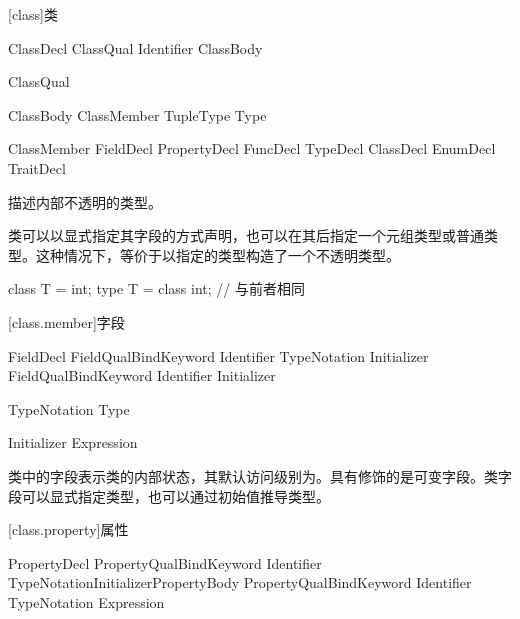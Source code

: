 
[class]{类}

\begin{bnf}{ClassDecl}
    ClassQual\bnfs {} Identifier ClassBody
\end{bnf}

\begin{bnf}{ClassQual}
\end{bnf}

\begin{bnf}{ClassBody}
    \terminal{\{} ClassMember\bnfs \terminal{\}} \br
    TupleType \br
    \terminal{=} Type
\end{bnf}

\begin{bnf}{ClassMember}
    FieldDecl \br
    PropertyDecl \br
    FuncDecl \br
    TypeDecl \br
    ClassDecl \br
    EnumDecl \br
    TraitDecl
\end{bnf}

\pnum
{}描述内部不透明的类型。

\pnum
类可以以显式指定其字段的方式声明，也可以在其后指定一个元组类型或普通类型。这种情况下，等价于以指定的类型构造了一个不透明类型。

\enterexample
\begin{codeblock}
class T = int;
type T = class int; // 与前者相同
\end{codeblock}
\exitexample

[class.member]{字段}

\begin{bnf}{FieldDecl}
    FieldQual\bnfs BindKeyword Identifier TypeNotation Initializer\bnfq \terminal{;}
    FieldQual\bnfs BindKeyword Identifier Initializer \terminal{;}
\end{bnf}

\begin{bnf}{TypeNotation}
    \terminal{:} Type
\end{bnf}

\begin{bnf}{Initializer}
    \terminal{=} Expression
\end{bnf}

\pnum
类中的字段表示类的内部状态，其默认访问级别为。具有修饰的是可变字段。类字段可以显式指定类型，也可以通过初始值推导类型。

[class.property]{属性}

\begin{bnf}{PropertyDecl}
    PropertyQual\bnfs BindKeyword Identifier TypeNotation\bnfq Initializer\bnfq PropertyBody \terminal{;} \br
    PropertyQual\bnfs BindKeyword Identifier TypeNotation\bnfq \terminal{=>} Expression \terminal{;}
\end{bnf}

